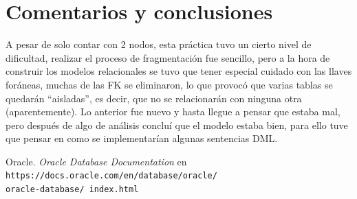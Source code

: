\documentclass{article}
\begin{document}
\section*{Comentarios y conclusiones}

A pesar de solo contar con 2 nodos, esta práctica tuvo un cierto nivel de 
dificultad, realizar el proceso de fragmentación fue sencillo, pero a la hora
de construir los modelos relacionales se tuvo que tener especial cuidado con
las llaves foráneas, muchas de las FK se eliminaron, lo que provocó que varias 
tablas se quedarán ``aisladas'', es decir, que no se relacionarán con ninguna 
otra (aparentemente). Lo anterior fue nuevo y hasta llegue a pensar que estaba
mal, pero después de algo de análisis concluí que el modelo estaba bien, para
ello tuve que pensar en como se implementarían algunas sentencias DML.

\renewcommand\refname{Bibliografía}
\begin{thebibliography}{99}
     Oracle. \textit{Oracle Database Documentation} en 
        \texttt{https://docs.oracle.com/en/database/oracle/\\oracle-database/%
        index.html}
\end{thebibliography}
\end{document}
